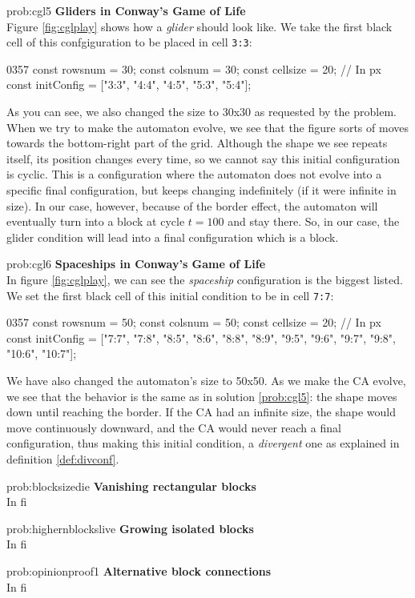 \begin{sol}{prob:cgl5}
\textbf{Gliders in Conway's Game of Life}\\
Figure \ref{fig:cglplay} shows how a \textit{glider} should look like.  We take
the first black cell of this confgiguration to be placed in cell \texttt{3:3}:
\begin{codeh2}{0}{3}{5}{7}
const rowsnum = 30;
const colsnum = 30;
const cellsize = 20; // In px
const initConfig = ["3:3", "4:4", "4:5", "5:3", "5:4"];
\end{codeh2}
As you can see, we also changed the size to 30x30 as requested by the problem.
When we try to make the automaton evolve, we see that the figure sorts of moves towards the bottom-right
part of the grid. Although the shape we see repeats itself, its position changes every time,
so we cannot say this initial configuration is cyclic. This is a configuration where the automaton does
not evolve into a specific final configuration, but keeps changing indefinitely (if it were infinite in size).
In our case, however, because of the border effect, the automaton will eventually turn into a block at cycle
$t=100$ and stay there. So, in our case, the glider condition will lead into a final configuration which is
a block.
\end{sol}

\begin{sol}{prob:cgl6}
\textbf{Spaceships in Conway's Game of Life}\\
In figure \ref{fig:cglplay}, we can see the \textit{spaceship} configuration is the biggest listed.
We set the first black cell of this initial condition to be in cell \texttt{7:7}:
\begin{codeh2}{0}{3}{5}{7}
const rowsnum = 50;
const colsnum = 50;
const cellsize = 20; // In px
const initConfig = ["7:7", "7:8", "8:5", "8:6", "8:8", "8:9", "9:5", "9:6", "9:7", "9:8", "10:6", "10:7"];
\end{codeh2}
We have also changed the automaton's size to 50x50.
As we make the CA evolve, we see that the behavior is the same as in solution \ref{prob:cgl5}: the shape
moves down until reaching the border. If the CA had an infinite size, the shape would move continuously
downward, and the CA would never reach a final configuration, thus making this initial condition, a
\textit{divergent} one as explained in definition \ref{def:divconf}.
\end{sol}

\begin{sol}{prob:blocksizedie}
\textbf{Vanishing rectangular blocks}\\
In fi
\end{sol}

\begin{sol}{prob:highernblockslive}
\textbf{Growing isolated blocks}\\
In fi
\end{sol}

\begin{sol}{prob:opinionproof1}
\textbf{Alternative block connections}\\
In fi
\end{sol}
